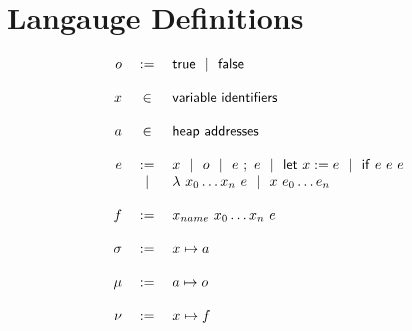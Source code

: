 \documentclass[9pt]{article}
\begin{document}
\section{Langauge Definitions}

\[
	\begin{array}{rcl}
	o &:=& \mathsf{true} ~~|~~ \mathsf{false}\\
	\\
	x &\in& \mathsf{variable~identifiers}\\
	\\
	a &\in& \mathsf{heap~addresses}\\
	\\
	e &:=& x ~~|~~ o ~~|~~ e~;~e ~~|~~ \mathsf{let}~x:=e ~~|~~ \mathsf{if}~e~e~e\\
	       &~~|~~& \lambda~x_0 \ldots x_n~e ~~|~~ x~e_0 \ldots e_n\\
	\\
	f &:=& x_{name}~x_0 \ldots x_n~e\\
	\\
	\sigma &:=& x \mapsto a\\
	\\
	\mu &:=& a \mapsto o\\
	\\
	\nu &:=& x \mapsto f\\
	\\
	\end{array}
\]
\end{document}
